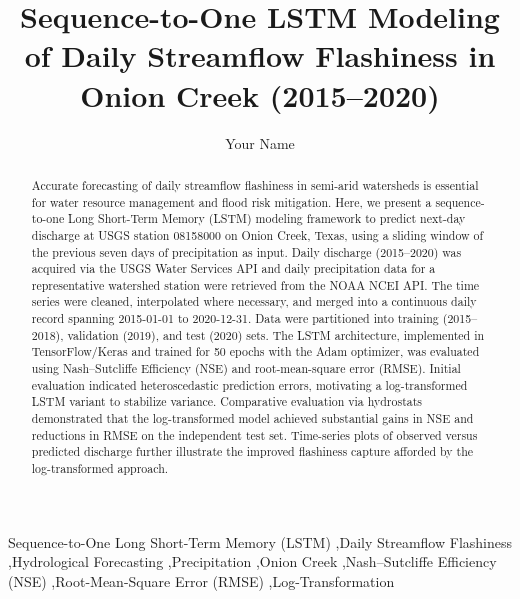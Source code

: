 \documentclass[preprint,12pt]{elsarticle}
\begin{document}
\begin{frontmatter}

\title{Sequence-to-One LSTM Modeling of Daily Streamflow Flashiness in Onion Creek (2015--2020)}

\author[1]{Your Name}

\begin{abstract}
Accurate forecasting of daily streamflow flashiness in semi-arid watersheds is essential for water resource management and flood risk mitigation. Here, we present a sequence-to-one Long Short-Term Memory (LSTM) modeling framework to predict next-day discharge at USGS station 08158000 on Onion Creek, Texas, using a sliding window of the previous seven days of precipitation as input. Daily discharge (2015--2020) was acquired via the USGS Water Services API and daily precipitation data for a representative watershed station were retrieved from the NOAA NCEI API. The time series were cleaned, interpolated where necessary, and merged into a continuous daily record spanning 2015-01-01 to 2020-12-31. Data were partitioned into training (2015--2018), validation (2019), and test (2020) sets. The LSTM architecture, implemented in TensorFlow/Keras and trained for 50 epochs with the Adam optimizer, was evaluated using Nash--Sutcliffe Efficiency (NSE) and root-mean-square error (RMSE). Initial evaluation indicated heteroscedastic prediction errors, motivating a log-transformed LSTM variant to stabilize variance. Comparative evaluation via hydrostats demonstrated that the log-transformed model achieved substantial gains in NSE and reductions in RMSE on the independent test set. Time-series plots of observed versus predicted discharge further illustrate the improved flashiness capture afforded by the log-transformed approach.
\end{abstract}

\begin{keyword}
Sequence-to-One Long Short-Term Memory (LSTM) \sep Daily Streamflow Flashiness \sep Hydrological Forecasting \sep Precipitation \sep Onion Creek \sep Nash--Sutcliffe Efficiency (NSE) \sep Root-Mean-Square Error (RMSE) \sep Log-Transformation
\end{keyword}

\end{frontmatter}
\end{document}
